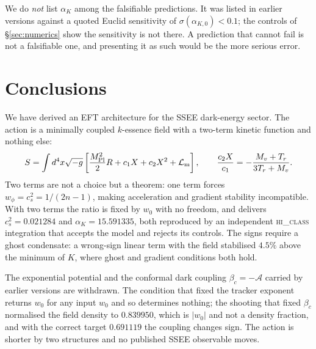 \documentclass[12pt,a4paper]{article}
\newcommand{\AURA}{\mathcal{A}}
\newcommand{\Mpl}{M_{\mathrm{Pl}}}
\newcommand{\bc}{\beta_c}
\begin{document}
We do \emph{not} list $\alpha_K$ among the falsifiable predictions.  It
was listed in earlier versions against a quoted Euclid sensitivity of
$\sigma(\alpha_{K,0}) < 0.1$; the controls of §\ref{sec:numerics} show
the sensitivity is not there.  A prediction that cannot fail is not a
falsifiable one, and presenting it as such would be the more serious
error.
\section{Conclusions}
\label{sec:conclusions}

We have derived an EFT architecture for the SSEE dark-energy sector.  The
action is a minimally coupled $k$-essence field with a two-term kinetic
function and nothing else:
%
\begin{equation*}
  S = \int d^4x\sqrt{-g}\left[\frac{\Mpl^2}{2}R
      + c_1 X + c_2 X^2
      + \mathcal{L}_{\rm m}
  \right],
  \qquad \frac{c_2 X}{c_1} = -\frac{M_v+T_r}{3T_r+M_v}.
\end{equation*}
%
Two terms are not a choice but a theorem: one term forces
$w_\phi = c_s^2 = 1/(2n-1)$, making acceleration and gradient stability
incompatible.  With two terms the ratio is fixed by $w_0$ with no
freedom, and delivers $c_s^2 = 0.021284$ and $\alpha_K = 15.591335$, both
reproduced by an independent \textsc{hi\_class} integration that accepts
the model and rejects its controls.  The signs require a ghost
condensate: a wrong-sign linear term with the field stabilised $4.5\%$
above the minimum of $K$, where ghost and gradient conditions both hold.

The exponential potential and the conformal dark coupling
$\bc = -\AURA$ carried by earlier versions are withdrawn.  The condition
that fixed the tracker exponent returns $w_0$ for any input $w_0$ and so
determines nothing; the shooting that fixed $\bc$ normalised the field
density to $0.839950$, which is $|w_0|$ and not a density fraction, and
with the correct target $0.691119$ the coupling changes sign.  The
action is shorter by two structures and no published SSEE observable
moves.
\end{document}
